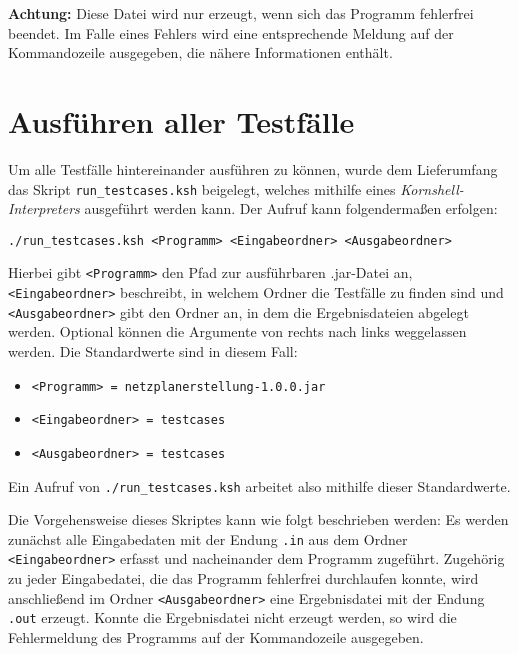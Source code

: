 \textbf{Achtung:} Diese
Datei wird nur erzeugt, wenn sich das Programm fehlerfrei beendet. Im
Falle eines Fehlers wird eine entsprechende Meldung auf der
Kommandozeile ausgegeben, die n\"ahere Informationen enth\"alt.

\section{Ausf\"uhren aller Testf\"alle}

Um alle Testf\"alle hintereinander ausf\"uhren zu k\"onnen, wurde dem
Lieferumfang das Skript \texttt{run\_testcases.ksh} beigelegt, welches
mithilfe eines \textit{Kornshell-Interpreters} ausgef\"uhrt werden
kann.
Der Aufruf kann folgenderma{\ss}en erfolgen:
\begin{verbatim}
./run_testcases.ksh <Programm> <Eingabeordner> <Ausgabeordner>
\end{verbatim}
Hierbei gibt \texttt{<Programm>} den Pfad zur ausf\"uhrbaren .jar-Datei
an, \texttt{<Eingabeordner>} beschreibt, in welchem Ordner die
Testf\"alle zu finden sind und \texttt{<Ausgabeordner>} gibt den
Ordner an, in dem die Ergebnisdateien abgelegt werden. Optional
k\"onnen die Argumente von rechts nach links weggelassen werden. Die
Standardwerte sind in diesem Fall:
\begin{itemize}
  \item \texttt{<Programm> = netzplanerstellung-1.0.0.jar}
  \item \texttt{<Eingabeordner> = testcases}
  \item \texttt{<Ausgabeordner> = testcases}
\end{itemize}
Ein Aufruf von \texttt{./run\_testcases.ksh} arbeitet also mithilfe
dieser Standardwerte.

Die Vorgehensweise dieses Skriptes kann wie folgt beschrieben werden:
Es werden zun\"achst alle Eingabedaten mit der Endung \texttt{.in} aus
dem Ordner \texttt{<Eingabeordner>} erfasst und nacheinander dem
Programm zugef\"uhrt. Zugeh\"orig zu jeder Eingabedatei, die das
Programm fehlerfrei durchlaufen konnte, wird anschlie{\ss}end im
Ordner \texttt{<Ausgabeordner>} eine Ergebnisdatei mit der Endung
\texttt{.out} erzeugt. Konnte die Ergebnisdatei nicht erzeugt werden,
so wird die Fehlermeldung des Programms auf der Kommandozeile
ausgegeben.
